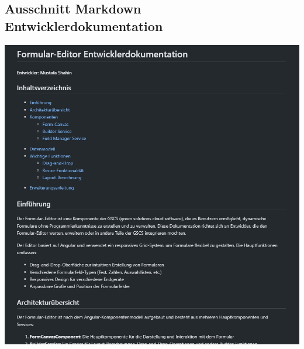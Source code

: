 \documentclass[a4paper,11pt]{article}
\begin{document}
\subsection{Ausschnitt Markdown Entwicklerdokumentation}
\includegraphics[width=1.1\textwidth]{dev-doc}
\end{document}

